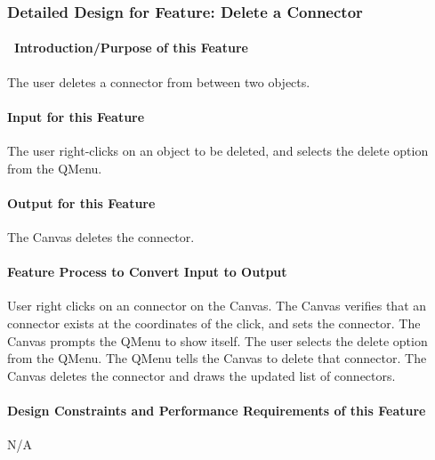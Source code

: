 \documentclass[twoside,letterpaper]{article}
\begin{document}
{\clearpage


  

\subsubsection{Detailed Design for Feature: Delete a Connector}

\paragraph[\ Introduction/Purpose of this Feature]
{\ Introduction/Purpose of this Feature}
{\color{black}
The user deletes a connector from between two objects.
}

\paragraph[Input for this Feature]{Input for this Feature}
{\color{black}
The user right-clicks on an object to be deleted, and selects the delete option from the QMenu.
}

\paragraph{Output for this Feature}
{\color{black}
The Canvas deletes the connector.
}

\paragraph{Feature Process to Convert Input to Output}
{\color{black}
User right clicks on an connector on the Canvas. The Canvas verifies that an connector exists at the coordinates of the click, and sets the connector.  The Canvas prompts the QMenu to show itself.  The user selects the delete option from the QMenu.  The QMenu tells the Canvas to delete that connector. The Canvas deletes the connector and draws the updated list of connectors.
}

\paragraph{Design Constraints and Performance Requirements of this Feature}
{\color{black}
N/A
}
\bigskip
\bigskip

}
\end{document}

